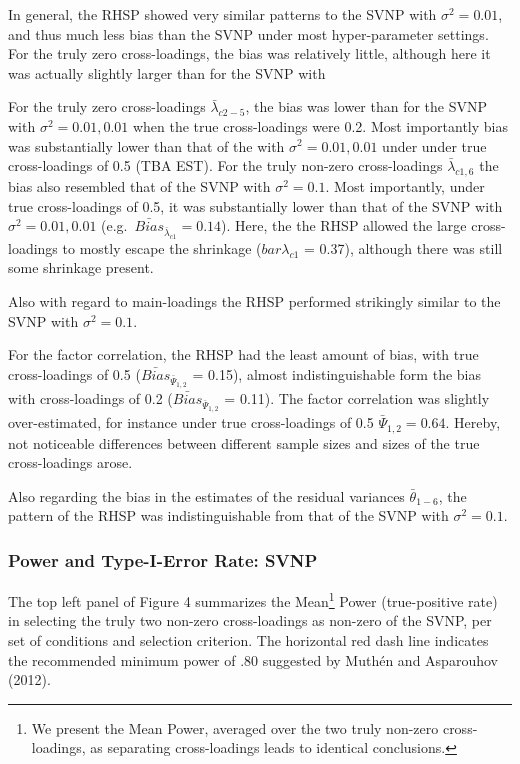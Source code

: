 \documentclass[
  man, donotrepeattitle,floatsintext]{apa6}
\begin{document}
In general, the RHSP showed very similar patterns to the SVNP with \(\sigma^2 = 0.01\), and thus much less bias than the SVNP under most hyper-parameter settings. For the truly zero cross-loadings, the bias was relatively little, although here it was actually slightly larger than for the SVNP with

For the truly zero cross-loadings \(\bar{\lambda}_{c 2-5}\), the bias was lower than for the SVNP with \(\sigma^2 = 0.01, 0.01\) when the true cross-loadings were 0.2. Most importantly bias was substantially lower than that of the with \(\sigma^2 = 0.01, 0.01\) under under true cross-loadings of 0.5 (TBA EST). For the truly non-zero cross-loadings \(\bar{\lambda}_{c 1, 6}\) the bias also resembled that of the SVNP with \(\sigma^2 = 0.1\). Most importantly, under true cross-loadings of 0.5, it was substantially lower than that of the SVNP with \(\sigma^2 = 0.01, 0.01\) (e.g.~\(\bar{Bias}_{\bar{\lambda}_{c 1}} = 0.14\)). Here, the the RHSP allowed the large cross-loadings to mostly escape the shrinkage (\(bar{\lambda}_{c 1}\) = 0.37), although there was still some shrinkage present.

Also with regard to main-loadings the RHSP performed strikingly similar to the SVNP with \(\sigma^2 = 0.1\).

For the factor correlation, the RHSP had the least amount of bias, with true cross-loadings of 0.5 (\(\bar{Bias}_{\bar{\Psi}_{1,2}}\) = 0.15), almost indistinguishable form the bias with cross-loadings of 0.2 (\(\bar{Bias}_{\bar{\Psi}_{1,2}}\) = 0.11). The factor correlation was slightly over-estimated, for instance under true cross-loadings of 0.5 \(\bar{\Psi}_{1,2} = 0.64\). Hereby, not noticeable differences between different sample sizes and sizes of the true cross-loadings arose.

Also regarding the bias in the estimates of the residual variances \(\bar{\theta}_{1-6}\), the pattern of the RHSP was indistinguishable from that of the SVNP with \(\sigma^2 = 0.1\).

\hypertarget{power-and-type-i-error-rate-svnp}{%
\subsubsection{Power and Type-I-Error Rate: SVNP}\label{power-and-type-i-error-rate-svnp}}

The top left panel of Figure 4 summarizes the Mean\footnote{We present the Mean Power, averaged over the two truly non-zero cross-loadings, as separating cross-loadings leads to identical conclusions.} Power (true-positive rate) in selecting the truly two non-zero cross-loadings as non-zero of the SVNP, per set of conditions and selection criterion. The horizontal red dash line indicates the recommended minimum power of .80 suggested by Muthén and Asparouhov (2012).
\end{document}
